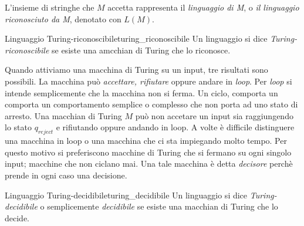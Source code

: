 \documentclass[12pt]{report}
\newcounter{definition}
\newcommand{\nmu}{}
\begin{document}
L'insieme di stringhe che $M$ accetta rappresenta il \textit{linguaggio di M}, o \textit{il linguaggio riconosciuto da M}, denotato con $L(M)$.
\begin{definition}{\nmu Linguaggio Turing-riconoscibile}{turing_riconoscibile}
Un linguaggio si dice \textit{Turing-riconoscibile} se esiste una amcchian di Turing che lo riconosce.
\end{definition}
Quando attiviamo una macchina di Turing su un input, tre risultati sono possibili. La macchina può \textit{accettare, rifiutare} oppure andare in \textit{loop}. Per \textit{loop} si intende semplicemente che la macchina non si ferma. Un ciclo, comporta un comporta  un comportamento semplice o complesso che non porta ad uno stato di arresto. Una macchian di Turing $M$ può non accetare un input sia raggiungendo lo stato $q_{reject}$ e rifiutando oppure andando in loop. A volte è difficile distinguere una macchina in loop o una macchina che ci sta impiegando molto tempo. Per questo motivo si preferiscono macchine di Turing che si fermano su ogni singolo input; macchine che non ciclano mai. Una tale macchina è detta \textit{decisore} perchè prende in ogni caso una decisione.
\begin{definition}{\nmu Linguaggio Turing-decidibile}{turing_decidibile}
	Un linguaggio si dice \textit{Turing-decidibile} o semplicemente \textit{decidibile} se esiste una macchian di Turing che lo decide.
\end{definition}
\end{document}
